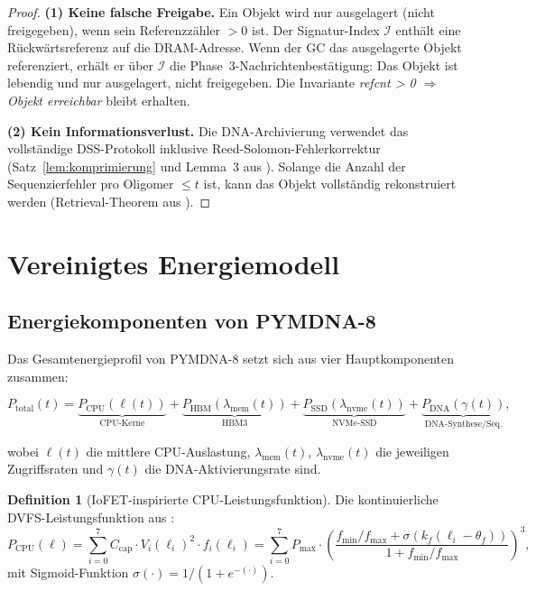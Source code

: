 ﻿\documentclass[a4paper,12pt]{article}
\theoremstyle{definition}
\newtheorem{definition}{Definition}[section]
\begin{document}
\begin{proof}
  \textbf{(1) Keine falsche Freigabe.} Ein Objekt wird nur ausgelagert
  (nicht freigegeben), wenn sein Referenzzähler $> 0$ ist. Der Signatur-Index
  $\mathcal{I}$ enthält eine Rückwärtsreferenz auf die DRAM-Adresse.
  Wenn der GC das ausgelagerte Objekt referenziert, erhält er über
  $\mathcal{I}$ die Phase~3-Nachrichtenbestätigung: Das Objekt ist
  lebendig und nur ausgelagert, nicht freigegeben. Die Invariante
  \emph{refcnt > 0 $\Rightarrow$ Objekt erreichbar} bleibt erhalten.

  \textbf{(2) Kein Informationsverlust.} Die DNA-Archivierung verwendet
  das vollständige DSS-Protokoll inklusive Reed-Solomon-Fehlerkorrektur
  (Satz~\ref{lem:komprimierung} und Lemma~3 aus \cite{epp2026dnastor}).
  Solange die Anzahl der Sequenzierfehler pro Oligomer $\le t$ ist,
  kann das Objekt vollständig rekonstruiert werden (Retrieval-Theorem
  aus \cite{epp2026dnastor}).
\end{proof}

\section{Vereinigtes Energiemodell}

\subsection{Energiekomponenten von PYMDNA-8}

Das Gesamtenergieprofil von PYMDNA-8 setzt sich aus vier Hauptkomponenten zusammen:

\begin{equation}
  P_{\mathrm{total}}(t) = \underbrace{P_{\mathrm{CPU}}(\ell(t))}_{\text{CPU-Kerne}}
  + \underbrace{P_{\mathrm{HBM}}(\lambda_{\mathrm{mem}}(t))}_{\text{HBM3}}
  + \underbrace{P_{\mathrm{SSD}}(\lambda_{\mathrm{nvme}}(t))}_{\text{NVMe-SSD}}
  + \underbrace{P_{\mathrm{DNA}}(\gamma(t))}_{\text{DNA-Synthese/Seq.}},
  \label{eq:p_total}
\end{equation}

\noindent wobei $\ell(t)$ die mittlere CPU-Auslastung, $\lambda_{\mathrm{mem}}(t)$,
$\lambda_{\mathrm{nvme}}(t)$ die jeweiligen Zugriffsraten und $\gamma(t)$
die DNA-Aktivierungsrate sind.

\begin{definition}[IoFET-inspirierte CPU-Leistungsfunktion]
  \label{def:iofet_power}
  Die kontinuierliche DVFS-Leistungsfunktion aus \cite{epp2026pymca8}:
  \begin{equation}
    P_{\mathrm{CPU}}(\ell) = \sum_{i=0}^{7}
    C_{\mathrm{cap}} \cdot V_i(\ell_i)^2 \cdot f_i(\ell_i)
    = \sum_{i=0}^{7} P_{\max} \cdot
    \left(\frac{f_{\min}/f_{\max} + \sigma(k_f(\ell_i - \theta_f))}
    {1 + f_{\min}/f_{\max}}\right)^3,
  \end{equation}
  mit Sigmoid-Funktion $\sigma(\cdot) = 1/(1+e^{-(\cdot)})$.
\end{definition}
\end{document}
